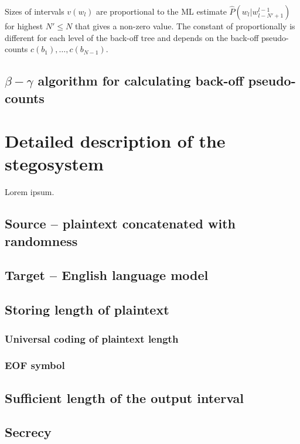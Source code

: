 \documentclass{IIBproject}
\begin{document}
Sizes of intervals $v(w_l)$ are proportional to the ML estimate $\hat P(w_l | w_{l-N'+1}^{l-1})$ for highest $N' \le N$ that gives a non-zero value. The constant of proportionally is different for each level of the back-off tree and depends on the back-off pseudo-counts $c(b_1), \dots, c(b_{N-1})$.

\subsection{$\beta-\gamma$ algorithm for calculating back-off pseudo-counts}

\newpage
\section{Detailed description of the stegosystem}

Lorem ipsum.

\subsection{Source -- plaintext concatenated with randomness}

\subsection{Target -- English language model}

\subsection{Storing length of plaintext}

\subsubsection{Universal coding of plaintext length}

\subsubsection{EOF symbol}

\subsection{Sufficient length of the output interval}

\subsection{Secrecy}
\end{document}
